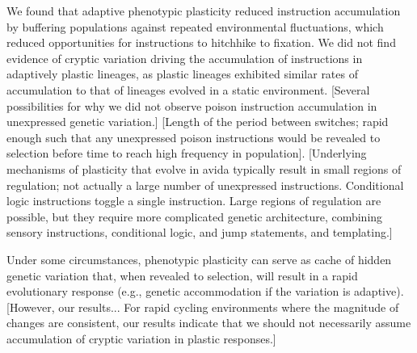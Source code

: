 We found that adaptive phenotypic plasticity reduced  instruction accumulation by buffering populations against repeated environmental fluctuations, which reduced opportunities for  instructions to hitchhike to fixation.
We did not find evidence of cryptic variation driving the accumulation of  instructions in adaptively plastic lineages, as plastic lineages exhibited similar rates of accumulation to that of lineages evolved in a static environment.
[Several possibilities for why we did not observe poison instruction accumulation in unexpressed genetic variation.]
[Length of the period between switches; rapid enough such that any unexpressed poison instructions would be revealed to selection before time to reach high frequency in population].
[Underlying mechanisms of plasticity that evolve in avida typically result in small regions of regulation; not actually a large number of unexpressed instructions. Conditional logic instructions toggle a single instruction. Large regions of regulation are possible, but they require more complicated genetic architecture, combining sensory instructions, conditional logic, and jump statements, and templating.]

Under some circumstances, phenotypic plasticity can serve as cache of hidden genetic variation that, when revealed to selection, will result in a rapid evolutionary response (e.g., genetic accommodation if the variation is adaptive).
[However, our results... For rapid cycling environments where the magnitude of changes are consistent, our results indicate that we should not necessarily assume accumulation of cryptic variation in plastic responses.]



